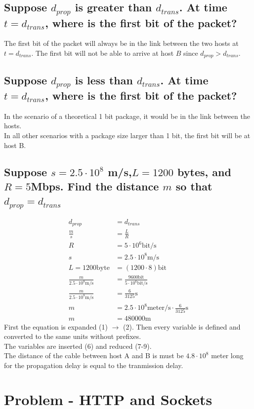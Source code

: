 \documentclass[12pt, a4paper]{article}
\begin{document}
		\subsection{Suppose $d_{prop}$ is greater than $d_{trans}$. At time $t=d_{trans}$, where is the first bit of the packet?}
			The first bit of the packet will always be in the link between the two hosts at $t=d_{trans}$. The first bit will not be able to arrive at host $B$ since $d_{prop}>d_{trans}$.
		\subsection{Suppose $d_{prop}$ is less than $d_{trans}$. At time $t=d_{trans}$, where is the first bit of the packet?}
			In the scenario of a theoretical 1 bit package, it would be in the link between the hosts.\\
			In all other scenarios with a package size larger than 1 bit, the first bit will be at host B.
		\subsection{Suppose $s=2.5\cdot 10^8$ m/s,$L=1200$ bytes, and $R=5$Mbps. Find the distance $m$ so that $d_{prop}=d_{trans}$}
			\begin{align}
				d_{prop}&=d_{trans}\\
				\frac{m}{s}&=\frac{L}{R}\\[3mm]
				R&=5\cdot 10^6\text{bit/s}\\
				s&=2.5\cdot 10^8\text{m/s}\\
				L=1200\text{byte}&=(1200\cdot 8)\text{bit}\\[3mm]
				\frac{m}{2.5\cdot 10^8\text{m/s}}&=\frac{9600\text{bit}}{5\cdot 10^6\text{bit/s}}\\
				\frac{m}{2.5\cdot 10^8\text{m/s}}&=\frac{6}{3125}\text{s}\\[3mm]
				m&=2.5\cdot 10^8\text{meter/s}\cdot \frac{6}{3125}\text{s}\\
				m&=480000\text{m}
			\end{align}
			First the equation is expanded (1) $\rightarrow$ (2). Then every variable is defined and converted to the same units without prefixes.\\
			The variables are inserted (6) and reduced (7-9).\\
			The distance of the cable between host A and B is must be $4.8\cdot 10^8$ meter long for the propagation delay is equal to the tranmission delay.
			\clearpage
	\section{Problem - HTTP and Sockets}
\end{document}
